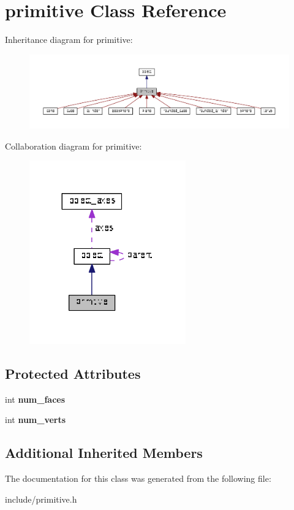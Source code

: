 \hypertarget{classprimitive}{}\section{primitive Class Reference}
\label{classprimitive}


Inheritance diagram for primitive\+:\nopagebreak
\begin{figure}[H]
\begin{center}
\leavevmode
\includegraphics[width=350pt]{classprimitive__inherit__graph}
\end{center}
\end{figure}


Collaboration diagram for primitive\+:\nopagebreak
\begin{figure}[H]
\begin{center}
\leavevmode
\includegraphics[width=191pt]{classprimitive__coll__graph}
\end{center}
\end{figure}
\subsection*{Protected Attributes}
\begin{DoxyCompactItemize}
\item 
\mbox{\label{classprimitive_a0bb6d28db907a63e9b361986efdcaac1}} 
int {\bfseries num\+\_\+faces}
\item 
\mbox{\label{classprimitive_a3ee44d21bc11e7fe15aed459fb0d16c2}} 
int {\bfseries num\+\_\+verts}
\end{DoxyCompactItemize}
\subsection*{Additional Inherited Members}


The documentation for this class was generated from the following file\+:\begin{DoxyCompactItemize}
\item 
include/primitive.\+h\end{DoxyCompactItemize}
